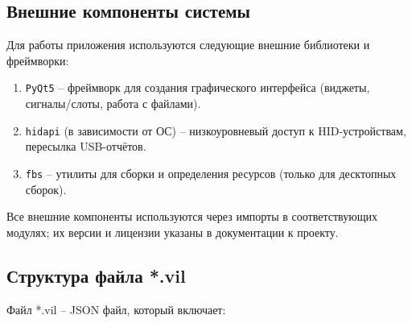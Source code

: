 \subsection{Внешние компоненты системы}

Для работы приложения используются следующие внешние библиотеки и фреймворки:

\begin{enumerate}
	\item \texttt{PyQt5} -- фреймворк для создания графического интерфейса (виджеты, сигналы/слоты, работа с файлами).
	\item \texttt{hidapi} (в зависимости от ОС) -- низкоуровневый доступ к HID-устройствам, пересылка USB-отчётов.
	\item \texttt{fbs} -- утилиты для сборки и определения ресурсов (только для десктопных сборок).
\end{enumerate}

Все внешние компоненты используются через импорты в соответствующих модулях; их версии и лицензии указаны в документации к проекту.

\subsection{Структура файла *.vil}

Файл *.vil -- JSON файл, который включает:

